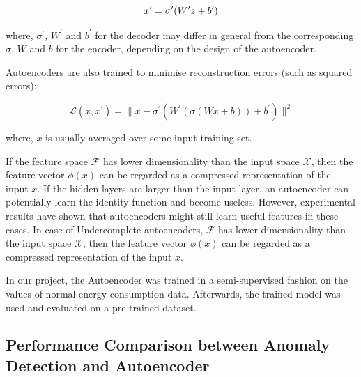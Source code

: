 \documentclass[conference]{IEEEtran}
\begin{document}
\begin{equation}
\boldmath{x^{\prime}} = \sigma^{\prime}(W^{\prime}z+b^{\prime})
\end{equation}

where, $\sigma^{\prime}$, $W^{\prime}$ and $b^{\prime}$ for the decoder may differ in general from the corresponding $\sigma$, $W$ and $b$ for the encoder, depending on the design of the autoencoder.

Autoencoders are also trained to minimise reconstruction errors (such as squared errors):

\begin{equation}
\mathcal{L}(x,x^{\prime}) = \|x- \sigma^{\prime}(W^{\prime}(\sigma(Wx+b))+b^{\prime})\|^2
\end{equation}

where, $x$ is usually averaged over some input training set.

If the feature space $\mathcal{F}$  has lower dimensionality than the input space $\mathcal{X}$, then the feature vector $\phi(x)$ can be regarded as a compressed representation of the input $x$.  If the hidden layers are larger than the input layer, an autoencoder can potentially learn the identity function and become useless. However, experimental results have shown that autoencoders might still learn useful features in these cases.
In case of Undercomplete autoencoders, $\mathcal{F}$ has lower dimensionality than the input space $\mathcal{X}$, then the feature vector $\phi(x)$  can be regarded as a compressed representation of the input $x$.

In our project, the Autoencoder was trained in a semi-supervised fashion on the values of normal energy consumption data. Afterwards, the trained model was used and evaluated on a pre-trained dataset. 


\subsection{\label{sec:level1}	Performance Comparison between Anomaly Detection and Autoencoder}
\end{document}
